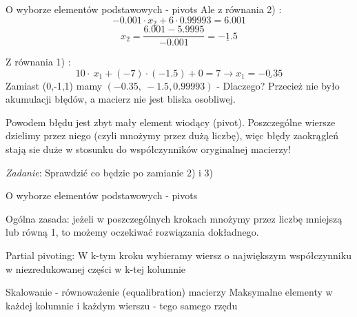 \begin{frame}{O wyborze elementów podstawowych - pivots}
Ale z równania 2) :
$$
-0.001\cdot x_{2}+6\cdot 0.99993=6.001
$$
$$
x_{2}=\frac{6.001-5.9995}{-0.001}=\underline{-1.5}
$$

Z równania 1) :
$$
10\cdot\ x_{1}+(-7)\cdot(-1.5)+0=7\rightarrow x_{1}=\underline{-0.35}
$$
Zamiast (0,-1,1) mamy $(-0.35,\ -1.5,0.99993)$ - Dlaczego? \newline 
Przecież nie było akumulacji błędów, a macierz nie jest bliska osobliwej.
\begin{alertblock}{}
Powodem błędu jest zbyt mały element wiodący (pivot). Poszczególne wiersze dzielimy przez niego (czyli mnożymy przez dużą liczbę), więc błędy zaokrągleń stają sie duże w stosunku do współczynników oryginalnej macierzy!
\end{alertblock}
\begin{flushright}
\textit{Zadanie}: Sprawdzić co będzie po zamianie 2) i 3) 
\end{flushright}
\end{frame}
\begin{frame}{ O wyborze elementów podstawowych - pivots}

Ogólna zasada: jeżeli w poszczególnych krokach mnożymy przez liczbę mniejszą lub równą 1, to możemy oczekiwać rozwiązania dokładnego.
\begin{exampleblock}{Partial pivoting:}
W $\mathrm{k}$-tym kroku wybieramy wiersz o największym współczynniku w niezredukowanej części w $\mathrm{k}$-tej kolumnie

\end{exampleblock}

\begin{exampleblock}{Skalowanie - równoważenie (equalibration) macierzy}
Maksymalne elementy w każdej kolumnie i każdym wierszu - tego samego rzędu
\end{exampleblock}

\end{frame}
